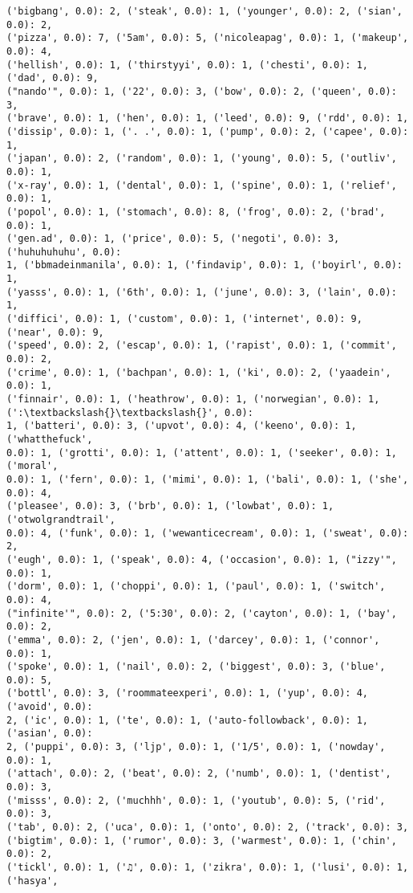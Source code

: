 \documentclass[11pt]{article}
\begin{document}
\begin{Verbatim}[commandchars=\\\{\}]
('bigbang', 0.0): 2, ('steak', 0.0): 1, ('younger', 0.0): 2, ('sian', 0.0): 2,
('pizza', 0.0): 7, ('5am', 0.0): 5, ('nicoleapag', 0.0): 1, ('makeup', 0.0): 4,
('hellish', 0.0): 1, ('thirstyyi', 0.0): 1, ('chesti', 0.0): 1, ('dad', 0.0): 9,
("nando'", 0.0): 1, ('22', 0.0): 3, ('bow', 0.0): 2, ('queen', 0.0): 3,
('brave', 0.0): 1, ('hen', 0.0): 1, ('leed', 0.0): 9, ('rdd', 0.0): 1,
('dissip', 0.0): 1, ('. .', 0.0): 1, ('pump', 0.0): 2, ('capee', 0.0): 1,
('japan', 0.0): 2, ('random', 0.0): 1, ('young', 0.0): 5, ('outliv', 0.0): 1,
('x-ray', 0.0): 1, ('dental', 0.0): 1, ('spine', 0.0): 1, ('relief', 0.0): 1,
('popol', 0.0): 1, ('stomach', 0.0): 8, ('frog', 0.0): 2, ('brad', 0.0): 1,
('gen.ad', 0.0): 1, ('price', 0.0): 5, ('negoti', 0.0): 3, ('huhuhuhuhu', 0.0):
1, ('bbmadeinmanila', 0.0): 1, ('findavip', 0.0): 1, ('boyirl', 0.0): 1,
('yasss', 0.0): 1, ('6th', 0.0): 1, ('june', 0.0): 3, ('lain', 0.0): 1,
('diffici', 0.0): 1, ('custom', 0.0): 1, ('internet', 0.0): 9, ('near', 0.0): 9,
('speed', 0.0): 2, ('escap', 0.0): 1, ('rapist', 0.0): 1, ('commit', 0.0): 2,
('crime', 0.0): 1, ('bachpan', 0.0): 1, ('ki', 0.0): 2, ('yaadein', 0.0): 1,
('finnair', 0.0): 1, ('heathrow', 0.0): 1, ('norwegian', 0.0): 1, (':\textbackslash{}\textbackslash{}', 0.0):
1, ('batteri', 0.0): 3, ('upvot', 0.0): 4, ('keeno', 0.0): 1, ('whatthefuck',
0.0): 1, ('grotti', 0.0): 1, ('attent', 0.0): 1, ('seeker', 0.0): 1, ('moral',
0.0): 1, ('fern', 0.0): 1, ('mimi', 0.0): 1, ('bali', 0.0): 1, ('she', 0.0): 4,
('pleasee', 0.0): 3, ('brb', 0.0): 1, ('lowbat', 0.0): 1, ('otwolgrandtrail',
0.0): 4, ('funk', 0.0): 1, ('wewanticecream', 0.0): 1, ('sweat', 0.0): 2,
('eugh', 0.0): 1, ('speak', 0.0): 4, ('occasion', 0.0): 1, ("izzy'", 0.0): 1,
('dorm', 0.0): 1, ('choppi', 0.0): 1, ('paul', 0.0): 1, ('switch', 0.0): 4,
("infinite'", 0.0): 2, ('5:30', 0.0): 2, ('cayton', 0.0): 1, ('bay', 0.0): 2,
('emma', 0.0): 2, ('jen', 0.0): 1, ('darcey', 0.0): 1, ('connor', 0.0): 1,
('spoke', 0.0): 1, ('nail', 0.0): 2, ('biggest', 0.0): 3, ('blue', 0.0): 5,
('bottl', 0.0): 3, ('roommateexperi', 0.0): 1, ('yup', 0.0): 4, ('avoid', 0.0):
2, ('ic', 0.0): 1, ('te', 0.0): 1, ('auto-followback', 0.0): 1, ('asian', 0.0):
2, ('puppi', 0.0): 3, ('ljp', 0.0): 1, ('1/5', 0.0): 1, ('nowday', 0.0): 1,
('attach', 0.0): 2, ('beat', 0.0): 2, ('numb', 0.0): 1, ('dentist', 0.0): 3,
('misss', 0.0): 2, ('muchhh', 0.0): 1, ('youtub', 0.0): 5, ('rid', 0.0): 3,
('tab', 0.0): 2, ('uca', 0.0): 1, ('onto', 0.0): 2, ('track', 0.0): 3,
('bigtim', 0.0): 1, ('rumor', 0.0): 3, ('warmest', 0.0): 1, ('chin', 0.0): 2,
('tickl', 0.0): 1, ('♫', 0.0): 1, ('zikra', 0.0): 1, ('lusi', 0.0): 1, ('hasya',

\end{Verbatim}
\end{document}
